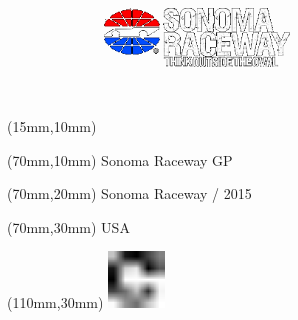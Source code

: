 \null\newpage
\begin{textblock*}{50mm}(15mm,10mm)%
\includegraphics[width=50mm]{LG/SON.png}
\end{textblock*}
\begin{textblock*}{130mm}(70mm,10mm)%
{\fontsize{20}{20}\selectfont Sonoma Raceway GP}\\
\end{textblock*}
\begin{textblock*}{120mm}(70mm,20mm)%
{\fontsize{16}{16}\selectfont Sonoma Raceway / 2015}\\
\end{textblock*}
\begin{textblock*}{120mm}(70mm,30mm)%
{\fontsize{12}{12}\selectfont USA}
\end{textblock*}
\begin{textblock*}{30mm}(110mm,30mm)%
\centering
\includegraphics[height=15mm]{icons/fa-rotate-right.pdf}
\end{textblock*}
